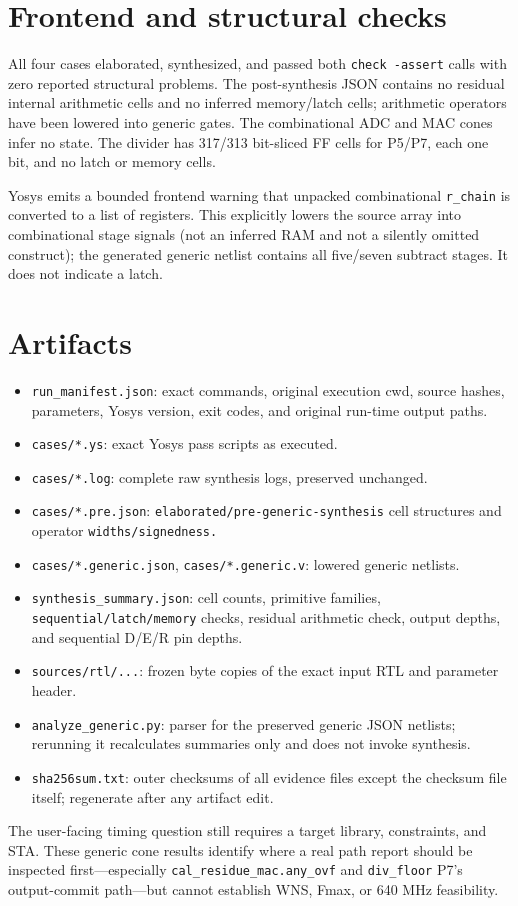 \documentclass[UTF8,fontset=fandol,10pt,a4paper,openany]{ctexrep}
\newcommand{\code}[1]{\nolinkurl{#1}}
\begin{document}
\section{Frontend and structural checks}


All four cases elaborated, synthesized, and passed both \code{check -assert} calls with zero reported structural problems. The post-synthesis JSON contains no residual internal arithmetic cells and no inferred memory/latch cells; arithmetic operators have been lowered into generic gates. The combinational ADC and MAC cones infer no state. The divider has 317/313 bit-sliced FF cells for P5/P7, each one bit, and no latch or memory cells.


Yosys emits a bounded frontend warning that unpacked combinational \code{r_chain} is converted to a list of registers. This explicitly lowers the source array into combinational stage signals (not an inferred RAM and not a silently omitted construct); the generated generic netlist contains all five/seven subtract stages. It does not indicate a latch.


\section{Artifacts}


\begin{itemize}
\item \code{run_manifest.json}: exact commands, original execution cwd, source hashes, parameters, Yosys version, exit codes, and original run-time output paths.
\item \code{cases/*.ys}: exact Yosys pass scripts as executed.
\item \code{cases/*.log}: complete raw synthesis logs, preserved unchanged.
\item \code{cases/*.pre.json}: \code{elaborated/pre-generic-synthesis} cell structures and operator \code{widths/signedness.}
\item \code{cases/*.generic.json}, \code{cases/*.generic.v}: lowered generic netlists.
\item \code{synthesis_summary.json}: cell counts, primitive families, \code{sequential/latch/memory} checks, residual arithmetic check, output depths, and sequential D/E/R pin depths.
\item \code{sources/rtl/...}: frozen byte copies of the exact input RTL and parameter header.
\item \code{analyze_generic.py}: parser for the preserved generic JSON netlists; rerunning it recalculates summaries only and does not invoke synthesis.
\item \code{sha256sum.txt}: outer checksums of all evidence files except the checksum file itself; regenerate after any artifact edit.
\end{itemize}


The user-facing timing question still requires a target library, constraints, and STA. These generic cone results identify where a real path report should be inspected first—especially \code{cal_residue_mac.any_ovf} and \code{div_floor} P7's output-commit path—but cannot establish WNS, Fmax, or 640 MHz feasibility.
\endgroup
\end{document}
